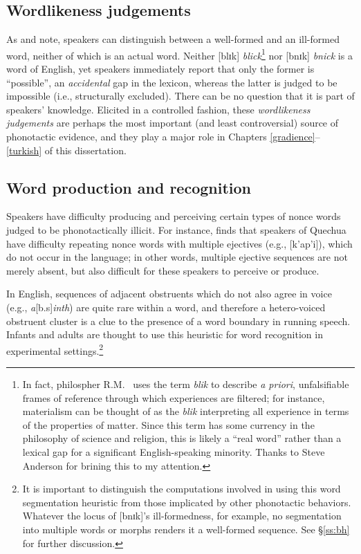 \subsection{Wordlikeness judgements}

As \citet{Halle1962} and \citet{Chomsky1965} note, speakers can distinguish between a well-formed and an ill-formed word, neither of which is an actual word.
Neither [blɪk] \emph{blick}\footnote{
    In fact, philospher R.M.~\citet{Hare1955} uses the term \emph{blik} to describe \emph{a priori}, unfalsifiable frames of reference through which experiences are filtered; for instance, materialism can be thought of as the \emph{blik} interpreting all experience in terms of the properties of matter. 
    Since this term has some currency in the philosophy of science and religion, this is likely a ``real word'' rather than a lexical gap for a significant English-speaking minority. 
    Thanks to Steve Anderson for brining this to my attention.}
nor [bnɪk] \emph{bnick} is a word of English, yet speakers immediately report that only the former is ``possible'', an \emph{accidental} gap in the lexicon, whereas the latter is judged to be impossible (i.e., structurally excluded).
There can be no question that it is part of speakers' knowledge.
Elicited in a controlled fashion, these \emph{wordlikeness judgements} are perhaps the most important (and least controversial) source of phonotactic evidence, and they play a major role in Chapters \ref{gradience}--\ref{turkish} of this dissertation.

\subsection{Word production and recognition}
\label{ss:wpr}

Speakers have difficulty producing \citep[e.g.,][]{Davidson2006a,Davidson2010,Rose2007,Vitevitch1997} and perceiving \citep{Dupoux1999,Kabak2007a,Massaro1983} certain types of nonce words judged to be phonotactically illicit.
For instance, \citet{GallagherInPress} finds that speakers of Quechua have difficulty repeating nonce words with multiple ejectives (e.g., [k'ap'i]), which do not occur in the language; in other words, multiple ejective sequences are not merely absent, but also difficult for these speakers to perceive or produce.

In English, sequences of adjacent obstruents which do not also agree in voice (e.g., \emph{a}[b.s]\emph{inth}) are quite rare within a word, and therefore a hetero-voiced obstruent cluster is a clue to the presence of a word boundary in running speech.
Infants \citep[e.g.,][]{Mattys2001b} and adults \citep{McQueen1998b,Norris1997} are thought to use this heuristic for word recognition in experimental settings.\footnote{
    It is important to distinguish the computations involved in using this word segmentation heuristic from those implicated by other phonotactic behaviors.
    Whatever the locus of [bnɪk]'s ill-formedness, for example, no segmentation into multiple words or morphs renders it a well-formed sequence.
    See \S\ref{ss:bh} for further discussion.}

